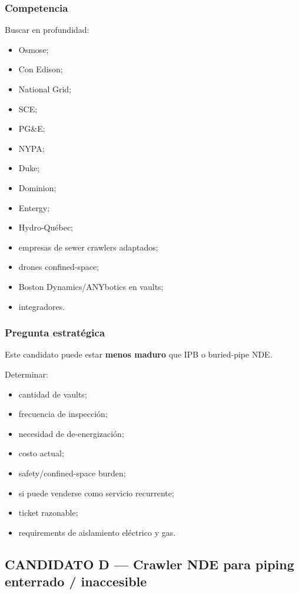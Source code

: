 \documentclass[11pt,a4paper]{article}
\begin{document}
\subsubsection*{Competencia}
Buscar en profundidad:

\begin{itemize}
\item Osmose;
\item Con Edison;
\item National Grid;
\item SCE;
\item PG\&E;
\item NYPA;
\item Duke;
\item Dominion;
\item Entergy;
\item Hydro-Québec;
\item empresas de sewer crawlers adaptados;
\item drones confined-space;
\item Boston Dynamics/ANYbotics en vaults;
\item integradores.
\end{itemize}


\subsubsection*{Pregunta estratégica}
Este candidato puede estar \textbf{menos maduro} que IPB o buried-pipe NDE.

Determinar:

\begin{itemize}
\item cantidad de vaults;
\item frecuencia de inspección;
\item necesidad de de-energización;
\item costo actual;
\item safety/confined-space burden;
\item si puede venderse como servicio recurrente;
\item ticket razonable;
\item requirements de aislamiento eléctrico y gas.
\end{itemize}


\subsection*{CANDIDATO D — Crawler NDE para piping enterrado / inaccesible}
\end{document}
